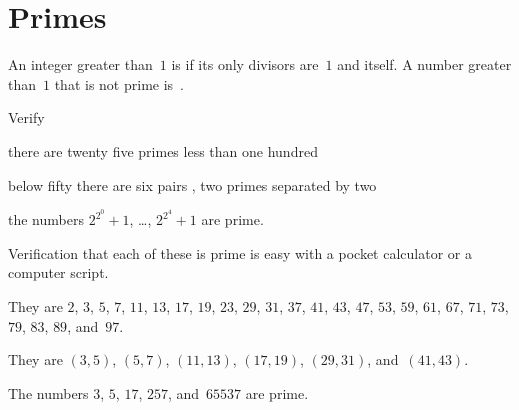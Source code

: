 \documentclass{ibl}  %
\begin{document}
\section{Primes}
\begin{df}
An integer greater than~$1$
is  if its only divisors are~$1$ and itself.
A number greater than~$1$ that is not prime is~.  
\end{df}

\begin{problem}[\maxlength]
Verify 
\begin{items}
\item there are twenty five primes less than one hundred
\item below fifty there are six pairs , two primes
  separated by two
\item the numbers $2^{2^0}+1$, \ldots, $2^{2^4}+1$ are prime.
\end{items}
\begin{answer}
Verification that each of these is prime is easy with a pocket calculator
or a computer script.
\begin{items}
\item 
  They are $2$, $3$, $5$, $7$, $11$, $13$, $17$, $19$, $23$, $29$, $31$, 
  $37$, $41$, $43$, $47$, $53$, $59$, $61$, $67$, $71$, $73$, $79$, $83$, 
  $89$, and~$97$.
\item 
  They are  $(3, 5)$, $(5, 7)$, $(11, 13)$, $(17, 19)$, 
  $(29, 31)$, and~$(41, 43)$.
\item
  The numbers $3$, $5$, $17$, $257$, and~$65537$ are prime.
\end{items}
\end{answer}
\end{problem}
\end{document}
